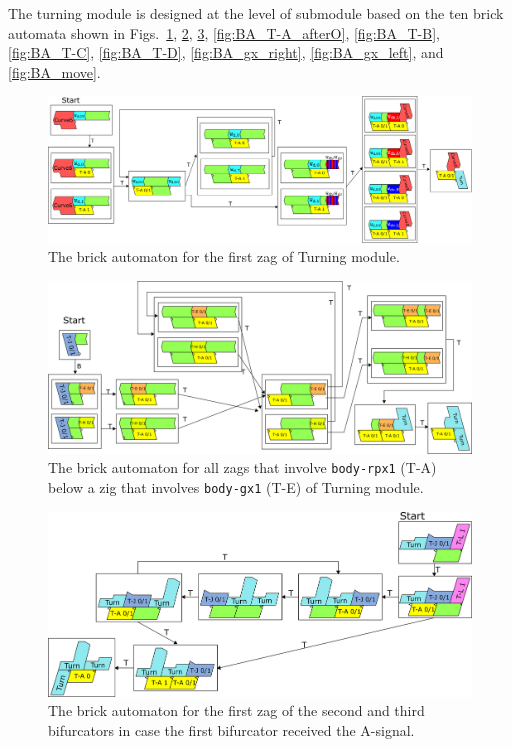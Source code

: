 \documentclass[runningheads]{llncs}
\begin{document}
The turning module is designed at the level of submodule based on the ten brick automata shown in Figs.~\ref{fig:BA_T-A_under_DFAO}, \ref{fig:BA_T-A_under_gx_left}, \ref{fig:BA_T-A_afterA}, \ref{fig:BA_T-A_afterO}, \ref{fig:BA_T-B}, \ref{fig:BA_T-C}, \ref{fig:BA_T-D}, \ref{fig:BA_gx_right}, \ref{fig:BA_gx_left}, and \ref{fig:BA_move}. 

\begin{figure}[ht]
\centering
\includegraphics[width=\linewidth]{Figs/Turner_BA/T-A_under_DFAO.png}
\caption{The brick automaton for the first zag of Turning module.}
\label{fig:BA_T-A_under_DFAO}
\end{figure}

\begin{figure}[ht]
\centering
\includegraphics[width=\linewidth]{Figs/Turner_BA/T-A_under_gx_left.png}
\caption{The brick automaton for all zags that involve \texttt{body-rpx1} (T-A) below a zig that involves \texttt{body-gx1} (T-E) of Turning module.}
\label{fig:BA_T-A_under_gx_left}
\end{figure}

\begin{figure}[ht]
\centering
\includegraphics[width=\linewidth]{Figs/Turner_BA/T-A_afterA.png}
\caption{The brick automaton for the first zag of the second and third bifurcators in case the first bifurcator received the A-signal.}
\label{fig:BA_T-A_afterA}
\end{figure}
\end{document}
